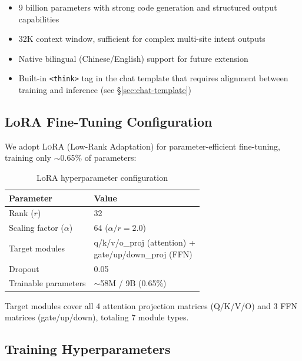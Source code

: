 \documentclass[12pt, a4paper]{article}
\newcommand{\lora}{\textsc{LoRA}}
\begin{document}
\begin{itemize}
  \item 9 billion parameters with strong code generation and structured output capabilities
  \item 32K context window, sufficient for complex multi-site intent outputs
  \item Native bilingual (Chinese/English) support for future extension
  \item Built-in \texttt{<think>} tag in the chat template that requires alignment between training and inference (see \S\ref{sec:chat-template})
\end{itemize}

\subsection{LoRA Fine-Tuning Configuration}

We adopt \lora{} (Low-Rank Adaptation) for parameter-efficient fine-tuning, training only $\sim$0.65\% of parameters:

\begin{table}[H]
\centering
\caption{LoRA hyperparameter configuration}
\label{tab:lora-config}
\small
\begin{tabular}{ll}
\toprule
\textbf{Parameter} & \textbf{Value} \\
\midrule
Rank ($r$)                & 32 \\
Scaling factor ($\alpha$) & 64 ($\alpha/r = 2.0$) \\
Target modules           & \makecell[l]{q/k/v/o\_proj (attention) +\\gate/up/down\_proj (FFN)} \\
Dropout                  & 0.05 \\
Trainable parameters     & $\sim$58M / 9B (0.65\%) \\
\bottomrule
\end{tabular}
\end{table}

\noindent
Target modules cover all 4 attention projection matrices (Q/K/V/O) and 3 FFN matrices (gate/up/down), totaling 7 module types.

\subsection{Training Hyperparameters}
\end{document}

